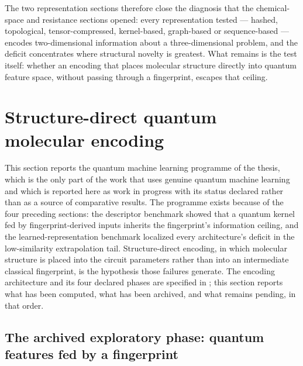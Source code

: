 The two representation sections therefore close the diagnosis that the chemical-space and resistance sections opened: every representation tested --- hashed, topological, tensor-compressed, kernel-based, graph-based or sequence-based --- encodes two-dimensional information about a three-dimensional problem, and the deficit concentrates where structural novelty is greatest. What remains is the test itself: whether an encoding that places molecular structure directly into quantum feature space, without passing through a fingerprint, escapes that ceiling.

\section{Structure-direct quantum molecular encoding}\label{sec:res_qmse}

This section reports the quantum machine learning programme of the thesis, which is the only part of the work that uses genuine quantum machine learning and which is reported here as work in progress with its status declared rather than as a source of comparative results. The programme exists because of the four preceding sections: the descriptor benchmark showed that a quantum kernel fed by fingerprint-derived inputs inherits the fingerprint's information ceiling, and the learned-representation benchmark localized every architecture's deficit in the low-similarity extrapolation tail. Structure-direct encoding, in which molecular structure is placed into the circuit parameters rather than into an intermediate classical fingerprint, is the hypothesis those failures generate. The encoding architecture and its four declared phases are specified in ; this section reports what has been computed, what has been archived, and what remains pending, in that order.

\subsection{The archived exploratory phase: quantum features fed by a fingerprint}\label{sec:res_qmse_archived}

